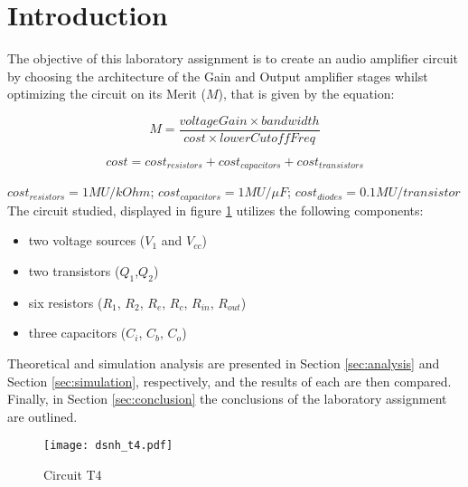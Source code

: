 
\section{Introduction}
\label{sec:introduction}



The objective of this laboratory assignment is to create an audio amplifier circuit by choosing the architecture of the Gain and Output amplifier stages whilst optimizing the circuit on its Merit ($M$), that is given by the equation:

\[
M = \frac{voltageGain\times bandwidth}{cost\times lowerCutoffFreq}
\]

\[
 cost = cost_{resistors} + cost_{capacitors} + cost_{transistors} 
\]

$cost_{resistors} = 1MU/kOhm$; $cost_{capacitors} = 1MU/\mu F$;
$cost_{diodes} = 0.1MU/transistor$ \\

The circuit studied, displayed in figure \ref{fig:Desenho_t4} utilizes the following components:

\begin{itemize}
	\item two voltage sources ($V_1$ and $V_{cc}$)
	\item two transistors ($Q_1$,$Q_2$)
	\item six resistors ($R_1$, $R_2$, $R_e$, $R_c$, $R_{in}$, $R_{out}$)
	\item three capacitors ($C_i$, $C_b$, $C_o$)
\end{itemize}


Theoretical and simulation analysis are presented in Section \ref{sec:analysis} and Section \ref{sec:simulation}, respectively, and the results of each are then compared.
Finally, in Section \ref{sec:conclusion} the conclusions of the laboratory assignment are outlined. 



\begin{figure}[ht]
	\centering
	\texttt{[image: dsnh\_t4.pdf]}
	\caption{Circuit T4}
\label{fig:Desenho_t4}
\end{figure}


